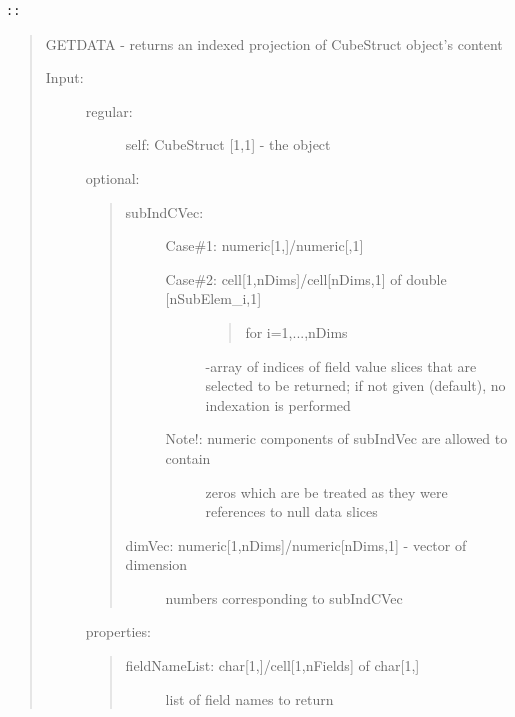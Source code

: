 \documentclass[letterpaper,10pt,english]{sphinxmanual}
\begin{document}
\begin{Verbatim}[commandchars=\\\{\}]
::
\end{Verbatim}
\begin{quote}

GETDATA - returns an indexed projection of CubeStruct object's content
\begin{description}
\item[{Input:}] \leavevmode\begin{description}
\item[{regular:}] \leavevmode
self: CubeStruct {[}1,1{]} - the object

\end{description}

optional:
\begin{quote}
\begin{description}
\item[{subIndCVec:}] \leavevmode
Case\#1: numeric{[}1,{]}/numeric{[},1{]}
\begin{description}
\item[{Case\#2: cell{[}1,nDims{]}/cell{[}nDims,1{]} of double {[}nSubElem\_i,1{]}}] \leavevmode\begin{quote}

for i=1,...,nDims
\end{quote}

-array of indices of field value slices that are selected
to be returned; if not given (default),
no indexation is performed

\item[{Note!: numeric components of subIndVec are allowed to contain}] \leavevmode
zeros which are be treated as they were references to null
data slices

\end{description}

\item[{dimVec: numeric{[}1,nDims{]}/numeric{[}nDims,1{]} - vector of dimension}] \leavevmode
numbers corresponding to subIndCVec

\end{description}
\end{quote}

properties:
\begin{quote}
\begin{description}
\item[{fieldNameList: char{[}1,{]}/cell{[}1,nFields{]} of char{[}1,{]}}] \leavevmode
list of field names to return


\end{description}
\end{quote}
\end{description}
\end{quote}
\end{document}
